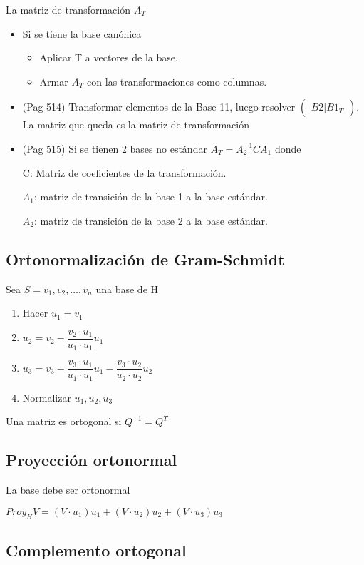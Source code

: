La matriz de transformación $A_T$
\begin{itemize}
	\item Si se tiene la base canónica
	\begin{itemize}
		\item Aplicar T a vectores de la base.
		\item Armar $A_T$ con las transformaciones como columnas.
	\end{itemize}
	\item (Pag 514) Transformar elementos de la Base 11, luego resolver $\begin{pmatrix}
	B2 | B1_T
	\end{pmatrix}$. La matriz que queda es la matriz de transformación
	\item (Pag 515) Si se tienen 2 bases no estándar $A_T=A_2^{-1}CA_1$ donde
	
	C: Matriz de coeficientes de la transformación.
	
	 $A_1$: matriz de transición de la base 1 a la base estándar.
	 
	 $A_2$: matriz de transición de la base 2 a la base estándar.
\end{itemize}

\subsection{Ortonormalización de Gram-Schmidt}
Sea $S={v_1,v_2,\dots,v_n}$ una base de H

\begin{enumerate}
	\item Hacer $u_1=v_1$
	\item $u_2=v_2-\dfrac{v_2\cdot u_1}{u_1\cdot u_1}u_1$
	\item $u_3=v_3-\dfrac{v_3\cdot u_1}{u_1\cdot u_1}u_1-\dfrac{v_3\cdot
	u_2}{u_2\cdot u_2}u_2$
	\item Normalizar $u_1,u_2,u_3$
\end{enumerate}

Una matriz es ortogonal si $Q^{-1}=Q^T$

\subsection{Proyección ortonormal}

La base debe ser ortonormal

$Proy_HV=(V\cdot u_1)u_1+(V\cdot u_2)u_2+(V\cdot u_3)u_3$
\subsection{Complemento ortogonal}

